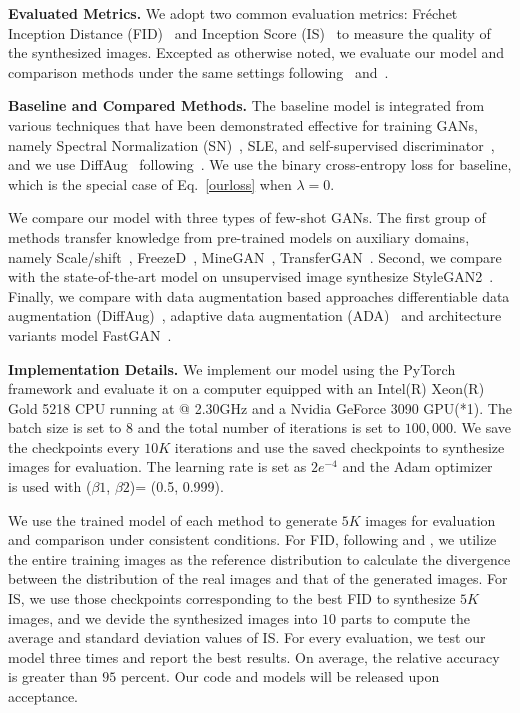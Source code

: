 \documentclass[10pt,journal,compsoc]{IEEEtran}
\begin{document}
\textbf{Evaluated Metrics.}
We adopt two common evaluation metrics: Fr\'{e}chet Inception Distance (FID)~\cite{FIDnips2017} and Inception Score (IS)~\cite{salimans2016improved} to measure the quality of the synthesized images.
Excepted as otherwise noted, we evaluate our model and comparison methods under the same settings following~\cite{liu2021towards} and~\cite{DiffAug}.

\textbf{Baseline and Compared Methods.} The baseline model is integrated from various techniques that have been demonstrated effective for training GANs, namely Spectral Normalization (SN)~\cite{miyato2018spectral}, SLE, and self-supervised discriminator~\cite{liu2021towards}, and we use DiffAug~\cite{DiffAug} following~\cite{liu2021towards}.
We use the binary cross-entropy loss for baseline, which is the special case of Eq.~\ref{ourloss} when $\lambda=0$.

We compare our model with three types of few-shot GANs. The first group of methods transfer knowledge from pre-trained models on auxiliary domains, namely Scale/shift~\cite{noguchi2019image}, FreezeD~\cite{mo2020freeze}, MineGAN~\cite{wang2020minegan}, TransferGAN~\cite{wang2018transferring}.
Second, we compare with the state-of-the-art model on unsupervised image synthesize StyleGAN2~\cite{karras2020analyzing}.
Finally, we compare with data augmentation based approaches differentiable data augmentation (DiffAug)~\cite{DiffAug}, adaptive data augmentation (ADA)~\cite{karras2020training} and architecture variants model FastGAN~\cite{liu2021towards}.

\textbf{Implementation Details.} We implement our model using the PyTorch framework and evaluate it on a computer equipped with an Intel(R) Xeon(R) Gold 5218 CPU running at @ 2.30GHz and a Nvidia GeForce 3090 GPU(*1).
The batch size is set to $8$ and the total number of iterations is set to $100,000$.
We save the checkpoints every $10K$ iterations and use the saved checkpoints to synthesize images for evaluation.
The learning rate is set as $2e^{-4}$ and the Adam optimizer~\cite{kingma2014adam} is used with ($\beta1$, $\beta2$)= (0.5, 0.999).

We use the trained model of each method to generate $5K$ images for evaluation and comparison under consistent conditions.
For FID, following \cite{liu2021towards} and \cite{DiffAug}, we utilize the entire training images as the reference distribution to calculate the divergence between the distribution of the real images and that of the generated images.
For IS, we use those checkpoints corresponding to the best FID to synthesize $5K$ images, and we devide the synthesized images into $10$ parts to compute the average and standard deviation values of IS.
For every evaluation, we test our model three times and report the best results. On average, the relative accuracy is greater than $95$ percent.
Our code and models will be released upon acceptance.
\end{document}
